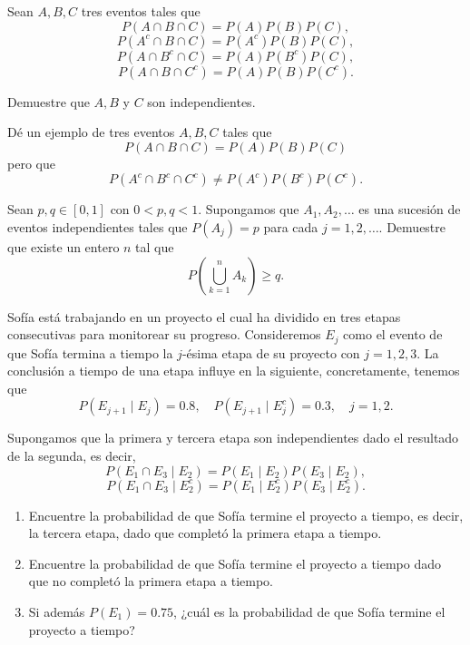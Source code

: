 \documentclass[12pt,a4paper]{article}
\begin{document}
    \begin{mdframed}[style=mdpinkbox,frametitle={Ejercicio 5}]
        Sean $A, B, C$ tres eventos tales que
        \[
        P(A \cap B \cap C) = P(A)P(B)P(C),
        \]
        \[
        P(A^c \cap B \cap C) = P(A^c)P(B)P(C),
        \]
        \[
        P(A \cap B^c \cap C) = P(A)P(B^c)P(C),
        \]
        \[
        P(A \cap B \cap C^c) = P(A)P(B)P(C^c).
        \]

        Demuestre que $A, B$ y $C$ son independientes.
    \end{mdframed}

    \begin{mdframed}[style=mdpinkbox,frametitle={Ejercicio 6}]
        Dé un ejemplo de tres eventos $A, B, C$ tales que
        \[
        P(A \cap B \cap C) = P(A)P(B)P(C)
        \]
        pero que
        \[
        P(A^c \cap B^c \cap C^c) \neq P(A^c)P(B^c)P(C^c).
        \]
    \end{mdframed}

    \begin{mdframed}[style=mdpinkbox,frametitle={Ejercicio 7}]
        Sean $p, q \in [0,1]$ con $0 < p,q < 1$. Supongamos que $A_1, A_2, \dots$ es una sucesión de eventos independientes tales que $P(A_j) = p$ para cada $j = 1,2,\dots$. Demuestre que existe un entero $n$ tal que
        \[
        P\left(\bigcup_{k=1}^{n} A_k\right) \geq q.
        \]
    \end{mdframed}

    \begin{mdframed}[style=mdpinkbox,frametitle={Ejercicio 8}]
        Sofía está trabajando en un proyecto el cual ha dividido en tres etapas consecutivas para monitorear su progreso. Consideremos $E_j$ como el evento de que Sofía termina a tiempo la $j$-ésima etapa de su proyecto con $j=1,2,3$. La conclusión a tiempo de una etapa influye en la siguiente, concretamente, tenemos que
        \[
        P(E_{j+1} \mid E_j) = 0.8, \quad P(E_{j+1} \mid E_j^c) = 0.3, \quad j=1,2.
        \]

        Supongamos que la primera y tercera etapa son independientes dado el resultado de la segunda, es decir,
        \[
        P(E_1 \cap E_3 \mid E_2) = P(E_1 \mid E_2)P(E_3 \mid E_2),
        \]
        \[
        P(E_1 \cap E_3 \mid E_2^c) = P(E_1 \mid E_2^c)P(E_3 \mid E_2^c).
        \]

        \begin{enumerate}
            \item[(a)] Encuentre la probabilidad de que Sofía termine el proyecto a tiempo, es decir, la tercera etapa, dado que completó la primera etapa a tiempo.
            \item[(b)] Encuentre la probabilidad de que Sofía termine el proyecto a tiempo dado que no completó la primera etapa a tiempo.
            \item[(c)] Si además $P(E_1)=0.75$, ¿cuál es la probabilidad de que Sofía termine el proyecto a tiempo?
        \end{enumerate}
    \end{mdframed}
\end{document}
